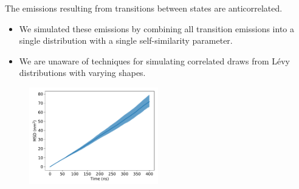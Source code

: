 \documentclass{article}
\begin{document}
  \noindent The emissions resulting from transitions between states are anticorrelated.
  \begin{itemize}
    \item We simulated these emissions by combining all transition emissions into a single
    distribution with a single self-similarity parameter.
    \item We are unaware of techniques for simulating correlated draws from L\'evy distributions
    with varying shapes.
  \end{itemize}
  

  
  \begin{figure}[!h]
  \centering
  \includegraphics[width=0.5\textwidth]{MET_msd.pdf}
  \caption{}\label{fig:msd_MET}
  \end{figure}
  
\end{document}

